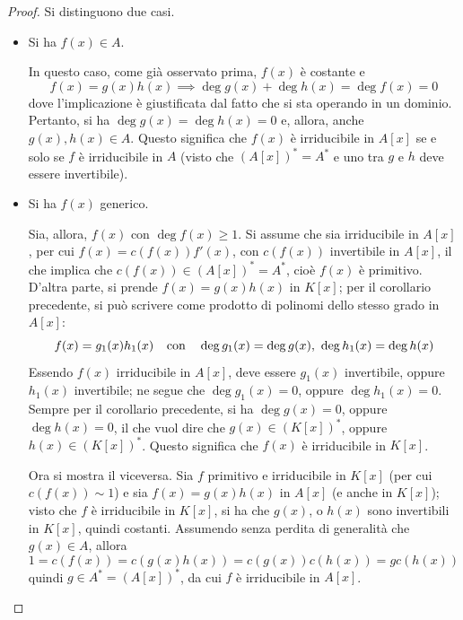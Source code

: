 \documentclass[12pt]{scrartcl}
\theoremstyle{style}
\numberwithin{equation}{subsection}
\begin{document}
			\begin{proof}
				Si distinguono due casi.	
				\begin{itemize}
					\item Si ha $f(x) \in A$.

						In questo caso, come gi\`a osservato prima, $f(x)$ \`e costante e 
						\[
						f(x) = g(x) h(x) \implies \operatorname{deg} g(x) + \operatorname{deg} h(x) = \operatorname{deg} f(x) = 0 
						\] 
						dove l'implicazione \`e giustificata dal fatto che si sta operando in un dominio.
						Pertanto, si ha $\operatorname{deg} g(x) = \operatorname{deg} h(x) = 0$ e, allora, anche $g(x) ,h(x) \in A$.
						Questo significa che $f(x)$ \`e irriducibile in $A[x]$ se e solo se $f$ \`e irriducibile in $A$ (visto che $(A[x])^* = A^*$ e uno tra $g$ e $h$ deve essere invertibile).
					\item Si ha $f(x)$ generico.

						Sia, allora, $f(x)$ con $\operatorname{deg} f(x) \ge 1$.
						Si assume che sia irriducibile in $A[x]$, per cui $f(x) = c(f(x)) f'(x)$, con $c(f(x))$ invertibile in $A[x]$, il che implica che $c(f(x)) \in (A[x])^* = A^*$, cio\`e $f(x)$ \`e primitivo.
						D'altra parte, si prende $f(x) = g(x) h(x)$ in $K[x]$; per il corollario precedente, si pu\`o scrivere come prodotto di polinomi dello stesso grado in $A[x]$:
						\[
						f(x) = g_1(x) h_1(x) \hspace{.25cm}  \text{ con  } \hspace{.25cm} \operatorname{deg} g_1(x) = \operatorname{deg} g(x) , \ \operatorname{deg} h_1(x) = \operatorname{deg} h(x)
						\] 
						Essendo $f(x)$ irriducibile in $A[x]$, deve essere $g_1(x)$ invertibile, oppure $h_1(x)$ invertibile; ne segue che $\operatorname{deg} g_1(x) = 0$, oppure $\operatorname{deg} h_1(x) = 0$.
						Sempre per il corollario precedente, si ha $\operatorname{deg} g(x) = 0 $, oppure $\operatorname{deg} h(x) = 0$, il che vuol dire che $g(x) \in (K[x])^*$, oppure $h(x) \in (K[x])^*$. 
						Questo significa che $f(x)$ \`e irriducibile in $K[x]$.

						Ora si mostra il viceversa. 
						Sia $f$ primitivo e irriducibile in $K[x]$ (per cui $c(f(x)) \sim 1$) e sia $f(x) = g(x) h(x) $ in $A[x]$ (e anche in $K[x]$); visto che $f$ \`e irriducibile in $K[x]$, si ha che $g(x)$, o $h(x)$ sono invertibili in $K[x]$, quindi costanti.
						Assumendo senza perdita di generalit\`a che $g(x) \in A$, allora
						\[
						1 = c(f(x)) = c(g(x) h(x)) = c(g(x)) c(h(x)) = gc(h(x))
						\] 
						quindi $g \in A^* = (A[x])^*$, da cui $f$ \`e irriducibile in $A[x]$.
				\end{itemize}
			\end{proof}
\end{document}
